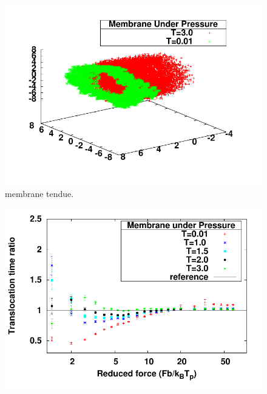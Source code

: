 \begin{figure}[H]
\begin{center}
\includegraphics[width=\textwidth]{3dmembranepressure.pdf}  

\caption[Membrane sous pression]{membrane tendue.}
\label{membranepression}
\end{center}
\end{figure}

\begin{figure}[H]
\begin{center}
\includegraphics[width=1\textwidth]{lowtension.pdf} 
\label{membranepressionevoltemp}
\end{center}
\end{figure}


